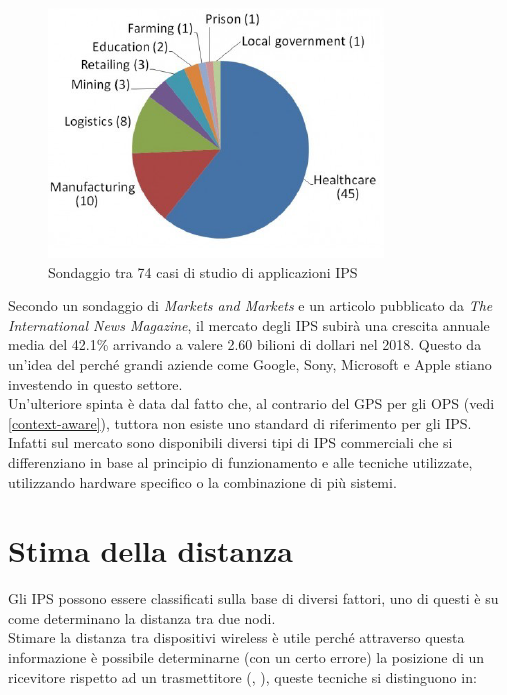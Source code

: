 \begin{figure}[H]  
	\centering 
	\includegraphics[scale=1.2]{ContestoApplicativo/application.png}
	\caption{Sondaggio tra 74 casi di studio di applicazioni IPS \cite{market}}
	\label{fig:surveyApplication}
\end{figure}

Secondo un sondaggio  di \textit{Markets and Markets} e un articolo pubblicato da\textit{ The International News Magazine}, il mercato degli IPS subirà una crescita annuale media del 42.1\% arrivando a valere 2.60 bilioni di dollari nel 2018. Questo da un'idea del perché grandi aziende come Google, Sony, Microsoft e Apple stiano investendo in questo settore.\\
Un'ulteriore spinta è data dal fatto che, al contrario del GPS per gli OPS (vedi \ref{context-aware}), tuttora non esiste uno standard di riferimento per gli IPS. Infatti sul mercato sono disponibili diversi tipi di IPS commerciali che si differenziano in base al principio di funzionamento e alle tecniche utilizzate, utilizzando hardware specifico o la combinazione di più sistemi.\\ 




\section{Stima della distanza}
\label{metodi_distanza}
Gli IPS possono essere classificati sulla base di diversi fattori, uno di questi è su come determinano la distanza tra due nodi.\\
Stimare \cite{IPS2} la distanza tra dispositivi wireless è utile perché attraverso questa informazione è possibile determinarne (con un certo errore) la posizione di un ricevitore rispetto ad un trasmettitore (\cite{alg1}, \cite{alg2}), queste tecniche si distinguono in:

